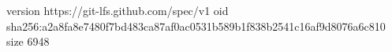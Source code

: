 version https://git-lfs.github.com/spec/v1
oid sha256:a2a8fa8e7480f7bd483ca87af0ac0531b589b1f838b2541c16af9d8076a6c810
size 6948
